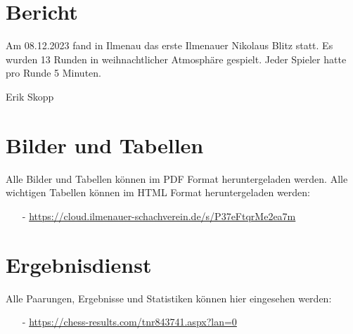 \documentclass[a4paper,ngerman]{tui-algo-seminar}
\title{\inhalt}
\author{Erik Skopp}
\newcommand{\inhalt}{Thüringer Einzelmeisterschaft 2024}
\begin{document}
\maketitle
\thispagestyle{plain}
\begin{abstract}
    Bericht: \inhalt.\\
    Das erste Nikolaus Blitzturnier des Ilmenauer Schachvereins fand am 08.12.2023 statt. Es wurden 13 Runden mit einer Bedenkzeit von 5 Minuten gespielt. Platz 1 erreichte Andreas Neubauer von BW Stadtilm. Platz 2 ging an Pascal Eichenauer. Platz 3 ging an Ainur Ziganshin.
\end{abstract}

\section{Bericht}
Am 08.12.2023 fand in Ilmenau das erste Ilmenauer Nikolaus Blitz statt. Es wurden 13 Runden in weihnachtlicher Atmosphäre gespielt. Jeder Spieler hatte pro Runde 5 Minuten.

Erik Skopp

\section{Bilder und Tabellen}
Alle Bilder und Tabellen können im PDF Format heruntergeladen werden. Alle wichtigen Tabellen können im HTML Format heruntergeladen werden: \\
\begin{itemize}
    \item[-] \url{https://cloud.ilmenauer-schachverein.de/s/P37eFtqrMe2ea7m}
\end{itemize}

\section{Ergebnisdienst}
Alle Paarungen, Ergebnisse und Statistiken können hier eingesehen werden: 
\begin{itemize}
    \item[-] \url{https://chess-results.com/tnr843741.aspx?lan=0}
\end{itemize}

\clearpage
\end{document}
